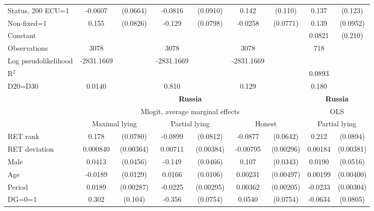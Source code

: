 \begin{tabular}{l|cccccc|cc}
Status, 200 ECU=1&  -0.0607         & (0.0664)&  -0.0816         & (0.0910)&    0.142         &  (0.110)&    0.137         &  (0.123)\\
Non-fixed=1     &    0.155\sym{*}  & (0.0826)&   -0.129         & (0.0798)&  -0.0258         & (0.0771)&    0.139         & (0.0952)\\
Constant        &                  &         &                  &         &                  &         &   0.0821         &  (0.210)\\
\hline
Observations    &     3078         &         &     3078         &         &     3078         &         &      718         &         \\
 
Log pseudolikelihood  & -2831.1669   &         &      -2831.1669             &         &       -2831.1669            &         &           &   \\ 
R$^2$      &                  &         &                  &         &                  &         &       0.0893           &   \\
D20=D30         &   0.0140         &         &    0.810         &         &    0.129         &         &    0.180         &         \\
\hline\hline
&\multicolumn{6}{c|}{\bf Russia}&\multicolumn{2}{c}{\bf Russia}\\ &\multicolumn{6}{c|}{Mlogit, average marginal effects }&\multicolumn{2}{c}{OLS}\\
                &\multicolumn{2}{c}{Maximal lying}&\multicolumn{2}{c}{Partial lying}&\multicolumn{2}{c}{Honest}  &\multicolumn{2}{c}{Partial lying}\\
\hline
RET rank        &    0.178\sym{**} & (0.0780)&  -0.0899         & (0.0812)&  -0.0877         & (0.0642)&    0.212\sym{**} & (0.0894)\\
RET deviation   & 0.000840         &(0.00364)&  0.00711\sym{*}  &(0.00384)& -0.00795\sym{***}&(0.00296)&  0.00184         &(0.00381)\\
Male            &   0.0413         & (0.0456)&   -0.149\sym{***}& (0.0466)&    0.107\sym{***}& (0.0343)&   0.0190         & (0.0516)\\
Age             &  -0.0189         & (0.0129)&   0.0166         & (0.0106)&  0.00231         &(0.00497)&  0.00199         &(0.00400)\\
Period          &   0.0189\sym{***}&(0.00287)&  -0.0225\sym{***}&(0.00295)&  0.00362\sym{*}  &(0.00205)&  -0.0233\sym{***}&(0.00304)\\
DG=0=1          &    0.302\sym{***}&  (0.104)&   -0.356\sym{***}& (0.0754)&   0.0540         & (0.0754)&  -0.0634         & (0.0805)\\

\end{tabular}
